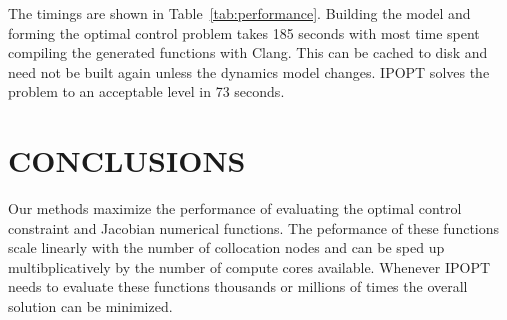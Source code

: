 \documentclass[11pt,twocolumn]{article}
\begin{document}
The timings are shown in Table~\ref{tab:performance}. Building the model and
forming the optimal control problem takes 185 seconds with most time spent
compiling the generated functions with Clang. This can be cached to disk and
need not be built again unless the dynamics model changes. IPOPT solves the
problem to an acceptable level in 73 seconds.

\section*{CONCLUSIONS}
%
Our methods maximize the performance of evaluating the optimal control
constraint and Jacobian numerical functions. The peformance of these functions
scale linearly with the number of collocation nodes and can be sped up
multibplicatively by the number of compute cores available. Whenever IPOPT needs
to evaluate these functions thousands or millions of times the overall solution
can be minimized.



\end{document}
